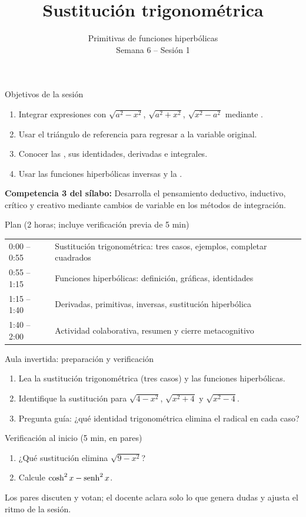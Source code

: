 \documentclass[10pt,aspectratio=169]{beamer}
\title[Sustitución trigonométrica e hiperbólicas]{Sustitución trigonométrica}
\subtitle{Primitivas de funciones hiperbólicas\\[2pt]\small Semana 6 -- Sesión 1}
\begin{document}
\begin{frame}
  \titlepage
\end{frame}

\begin{frame}{Objetivos de la sesión}
  \begin{enumerate}
    \item Integrar expresiones con $\sqrt{a^2-x^2}$, $\sqrt{a^2+x^2}$, $\sqrt{x^2-a^2}$ mediante .
    \item Usar el triángulo de referencia para regresar a la variable original.
    \item Conocer las , sus identidades, derivadas e integrales.
    \item Usar las funciones hiperbólicas inversas y la .
  \end{enumerate}
  \vspace{1mm}
  {\small\textbf{Competencia 3 del sílabo:} Desarrolla el pensamiento deductivo, inductivo, crítico y creativo mediante cambios de variable en los métodos de integración.}
  \begin{block}{Plan (2 horas; incluye verificación previa de 5 min)}
    \begin{tabular}{ll}
      0:00 -- 0:55 & Sustitución trigonométrica: tres casos, ejemplos, completar cuadrados\\
      0:55 -- 1:15 & Funciones hiperbólicas: definición, gráficas, identidades\\
      1:15 -- 1:40 & Derivadas, primitivas, inversas, sustitución hiperbólica\\
      1:40 -- 2:00 & Actividad colaborativa, resumen y cierre metacognitivo
    \end{tabular}
  \end{block}
\end{frame}

\begin{frame}{Aula invertida: preparación y verificación}
  \small
  \begin{previa}
    \begin{enumerate}
      \item Lea la sustitución trigonométrica (tres casos) y las funciones hiperbólicas.
      \item Identifique la sustitución para $\sqrt{4-x^2}$, $\sqrt{x^2+4}$ y $\sqrt{x^2-4}$.
      \item Pregunta guía: ¿qué identidad trigonométrica elimina el radical en cada caso?
    \end{enumerate}
  \end{previa}
  \begin{block}{Verificación al inicio (5 min, en pares)}
    \begin{enumerate}
      \item ¿Qué sustitución elimina $\sqrt{9-x^2}$?
      \item Calcule $\cosh^2x-\operatorname{senh}^2x$.
    \end{enumerate}
    Los pares discuten y votan; el docente aclara solo lo que genera dudas y ajusta el ritmo de la sesión.
  \end{block}
\end{frame}
\end{document}
